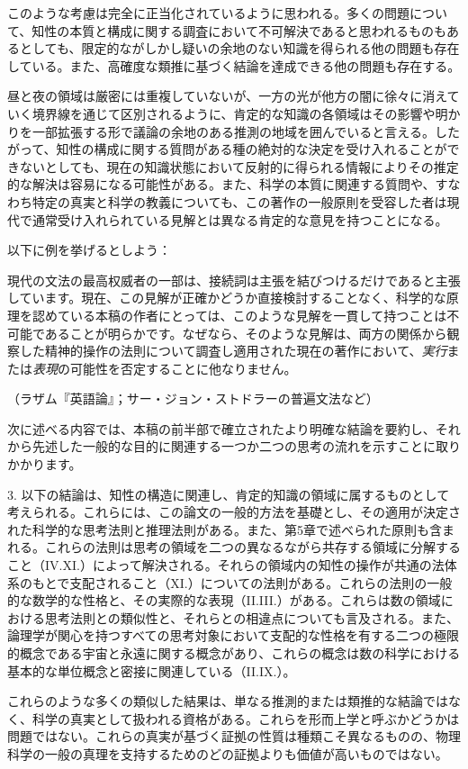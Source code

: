 \documentclass[a4paper,11pt,openany]{ltjsbook}
\begin{document}
このような考慮は完全に正当化されているように思われる。多くの問題について、知性の本質と構成に関する調査において不可解決であると思われるものもあるとしても、限定的ながしかし疑いの余地のない知識を得られる他の問題も存在している。また、高確度な類推に基づく結論を達成できる他の問題も存在する。

昼と夜の領域は厳密には重複していないが、一方の光が他方の闇に徐々に消えていく境界線を通じて区別されるように、肯定的な知識の各領域はその影響や明かりを一部拡張する形で議論の余地のある推測の地域を囲んでいると言える。したがって、知性の構成に関する質問がある種の絶対的な決定を受け入れることができないとしても、現在の知識状態において反射的に得られる情報によりその推定的な解決は容易になる可能性がある。また、科学の本質に関連する質問や、すなわち特定の真実と科学の教義についても、この著作の一般原則を受容した者は現代で通常受け入れられている見解とは異なる肯定的な意見を持つことになる。

以下に例を挙げるとしよう：

現代の文法の最高权威者の一部は、接続詞は主張を結びつけるだけであると主張しています。現在、この見解が正確かどうか直接検討することなく、科学的な原理を認めている本稿の作者にとっては、このような見解を一貫して持つことは不可能であることが明らかです。なぜなら、そのような見解は、両方の関係から観察した精神的操作の法則について調査し適用された現在の著作において、\emph{実行}または\emph{表現}の可能性を否定することに他なりません。

（ラザム『英語論』；サー・ジョン・ストドラーの普遍文法など）

次に述べる内容では、本稿の前半部で確立されたより明確な結論を要約し、それから先述した一般的な目的に関連する一つか二つの思考の流れを示すことに取りかかります。

3. 以下の結論は、知性の構造に関連し、肯定的知識の領域に属するものとして考えられる。これらには、この論文の一般的方法を基礎とし、その適用が決定された科学的な思考法則と推理法則がある。また、第5章で述べられた原則も含まれる。これらの法則は思考の領域を二つの異なるながら共存する領域に分解すること（IV.XI.）によって解決される。それらの領域内の知性の操作が共通の法体系のもとで支配されること（XI.）についての法則がある。これらの法則の一般的な数学的な性格と、その実際的な表現（II.III.）がある。これらは数の領域における思考法則との類似性と、それらとの相違点についても言及される。また、論理学が関心を持つすべての思考対象において支配的な性格を有する二つの極限的概念である宇宙と永遠に関する概念があり、これらの概念は数の科学における基本的な単位概念と密接に関連している（II.IX.）。

これらのような多くの類似した結果は、単なる推測的または類推的な結論ではなく、科学の真実として扱われる資格がある。これらを形而上学と呼ぶかどうかは問題ではない。これらの真実が基づく証拠の性質は種類こそ異なるものの、物理科学の一般の真理を支持するためのどの証拠よりも価値が高いものではない。
\end{document}
